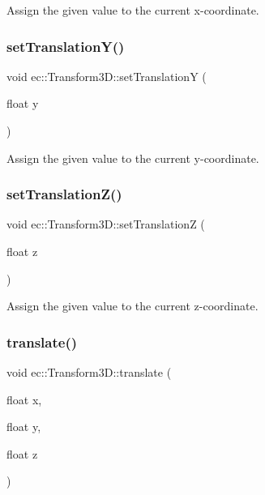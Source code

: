 Assign the given value to the current x-\/coordinate. \mbox{\label{classec_1_1_transform3_d_aa9d5eab59374d5e900c17c02a4c64b2f}} 
\subsubsection{\texorpdfstring{set\+Translation\+Y()}{setTranslationY()}}
{\footnotesize\ttfamily void ec\+::\+Transform3\+D\+::set\+TranslationY (\begin{DoxyParamCaption}\item[{float}]{y }\end{DoxyParamCaption})}

Assign the given value to the current y-\/coordinate. \mbox{\label{classec_1_1_transform3_d_aeddca7f4f74afd8394810222684fad30}} 
\subsubsection{\texorpdfstring{set\+Translation\+Z()}{setTranslationZ()}}
{\footnotesize\ttfamily void ec\+::\+Transform3\+D\+::set\+TranslationZ (\begin{DoxyParamCaption}\item[{float}]{z }\end{DoxyParamCaption})}

Assign the given value to the current z-\/coordinate. \mbox{\label{classec_1_1_transform3_d_a9c143bdc0bf020940b9b6bd7e2a01d45}} 
\subsubsection{\texorpdfstring{translate()}{translate()}\hspace{0.1cm}{\footnotesize\ttfamily [1/2]}}
{\footnotesize\ttfamily void ec\+::\+Transform3\+D\+::translate (\begin{DoxyParamCaption}\item[{float}]{x,  }\item[{float}]{y,  }\item[{float}]{z }\end{DoxyParamCaption})}

